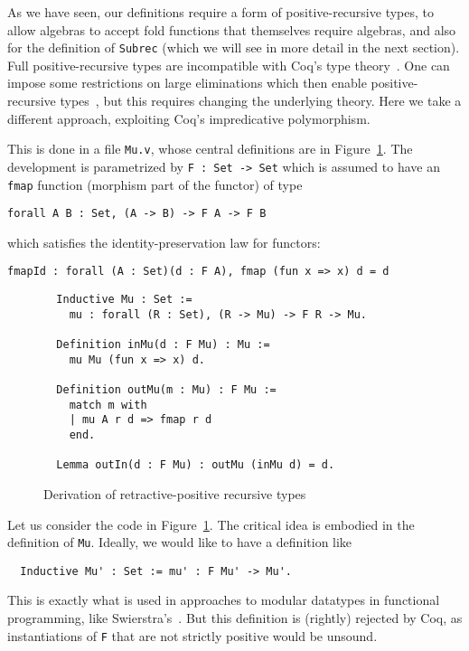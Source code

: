 \documentclass[a4paper,USenglish]{lipics-v2021}
\begin{document}
As we have seen, our definitions require a form of positive-recursive
types, to allow algebras to accept fold functions that themselves
require algebras, and also for the definition of \verb|Subrec| (which
we will see in more detail in the next section).  Full
positive-recursive types are incompatible with Coq's type
theory~\cite{coquand88}.  One can impose some restrictions on large
eliminations which then enable positive-recursive
types~\cite{blanqui05}, but this requires changing the underlying
theory.  Here we take a different approach, exploiting Coq's
impredicative polymorphism.

This is done in a file \verb|Mu.v|, whose central definitions are in
Figure~\ref{fig:mu}.  The development is parametrized by
\verb|F : Set -> Set| which is assumed to have an \verb|fmap| function
(morphism part of the functor) of type
\begin{verbatim}
forall A B : Set, (A -> B) -> F A -> F B
\end{verbatim}
\noindent which satisfies the identity-preservation law for functors:
\begin{verbatim}
fmapId : forall (A : Set)(d : F A), fmap (fun x => x) d = d
\end{verbatim}

\begin{figure}
\begin{verbatim}
  Inductive Mu : Set := 
    mu : forall (R : Set), (R -> Mu) -> F R -> Mu.

  Definition inMu(d : F Mu) : Mu :=
    mu Mu (fun x => x) d.

  Definition outMu(m : Mu) : F Mu :=
    match m with
    | mu A r d => fmap r d
    end.

  Lemma outIn(d : F Mu) : outMu (inMu d) = d.
\end{verbatim}
\caption{Derivation of retractive-positive recursive types}
\label{fig:mu}
\end{figure}  

Let us consider the code in Figure~\ref{fig:mu}.  The critical
idea is embodied in the definition of \verb|Mu|.  Ideally, we would like
to have a definition like
\begin{verbatim}
  Inductive Mu' : Set := mu' : F Mu' -> Mu'.
\end{verbatim}
\noindent This is exactly what is used in approaches to modular
datatypes in functional programming, like
Swierstra's~\cite{swierstra08}.  But this definition is (rightly)
rejected by Coq, as instantiations of
\verb|F| that are not strictly positive would be unsound.
\end{document}
